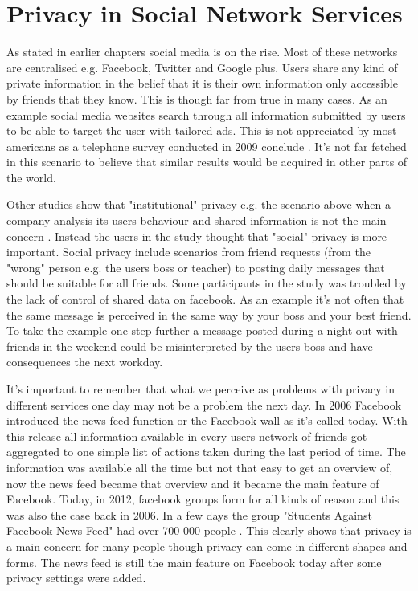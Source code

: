 \section{Privacy in Social Network Services}
As stated in earlier chapters social media is on the rise.
Most of these networks are centralised e.g. Facebook, Twitter and Google plus.
Users share any kind of private information in the belief that it is their own information only accessible by friends that they know.
This is though far from true in many cases.
As an example social media websites search through all information submitted by users to be able to target the user with tailored ads.
This is not appreciated by most americans as a telephone survey conducted in 2009 conclude \cite{turow2009}.
It's not far fetched in this scenario to believe that similar results would be acquired in other parts of the world.

Other studies show that "institutional" privacy e.g. the scenario above when a company analysis its users behaviour and shared information is not the main concern \cite{raynes-goldie2010}.
Instead the users in the study thought that "social" privacy is more important.
Social privacy include scenarios from friend requests (from the "wrong" person e.g. the users boss or teacher) to posting daily messages that should be suitable for all friends.
Some participants in the study was troubled by the lack of control of shared data on facebook.
As an example it's not often that the same message is perceived in the same way by your boss and your best friend.
To take the example one step further a message posted during a night out with friends in the weekend could be misinterpreted by the users boss and have consequences the next workday.

It's important to remember that what we perceive as problems with privacy in different services one day may not be a problem the next day.
In 2006 Facebook introduced the news feed function or the Facebook wall as it's called today.
With this release all information available in every users network of friends got aggregated to one simple list of actions taken during the last period of time.
The information was available all the time but not that easy to get an overview of, now the news feed became that overview and it became the main feature of Facebook.
Today, in 2012, facebook groups form for all kinds of reason and this was also the case back in 2006.
In a few days the group "Students Against Facebook News Feed" had over 700 000 people \cite{boyd2008}.
This clearly shows that privacy is a main concern for many people though privacy can come in different shapes and forms.
The news feed is still the main feature on Facebook today after some privacy settings were added.

